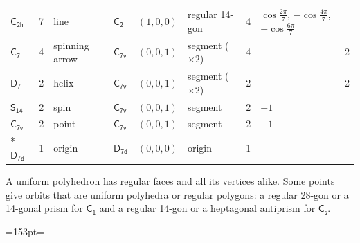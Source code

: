 \documentclass[10pt,a4paper]{article}
\newcommand{\needspace}[1]{\par\penalty-100\begingroup\dimen0=#1\relax\dimen2=\pagegoal
  \advance\dimen2-\pagetotal\ifdim\dimen0>\dimen2\relax\ifdim\dimen2>0pt\vfil\break\fi\fi
  \endgroup}
\numberwithin{equation}{section}
\newcommand{\grp}[1]{\mathsf{#1}}
\newlength{\fillwidth}\newlength{\cellwidth}\newlength{\colwidth}
\begin{document}
{{\begin{longtable}{@{}lrllllr>{\RaggedRight\arraybackslash}p{\fillwidth}r@{}}
\href{C2h.pdf}{$\grp{C_{2h}}$} & 7 & line & \href{C2.pdf}{$\grp{C_{2}}$} & $(1, 0, 0)$ & regular 14-gon & 4 & ${\cos\tfrac{2\pi}{7}}$, ${-\cos\tfrac{4\pi}{7}}$, ${-\cos\tfrac{6\pi}{7}}$ & \\
\href{C7.pdf}{$\grp{C_{7}}$} & 4 & spinning arrow & \href{C7v.pdf}{$\grp{C_{7v}}$} & $(0, 0, 1)$ & segment (${\times}2$) & 4 &  & 2\\
\href{D7.pdf}{$\grp{D_{7}}$} & 2 & helix & \href{C7v.pdf}{$\grp{C_{7v}}$} & $(0, 0, 1)$ & segment (${\times}2$) & 2 &  & 2\\
\href{S14.pdf}{$\grp{S_{14}}$} & 2 & spin & \href{C7v.pdf}{$\grp{C_{7v}}$} & $(0, 0, 1)$ & segment & 2 & ${-1}$ & \\
\href{C7v.pdf}{$\grp{C_{7v}}$} & 2 & point & \href{C7v.pdf}{$\grp{C_{7v}}$} & $(0, 0, 1)$ & segment & 2 & ${-1}$ & \\*
\href{D7d.pdf}{$\grp{D_{7d}}$} & 1 & origin & \href{D7d.pdf}{$\grp{D_{7d}}$} & $(0, 0, 0)$ & origin & 1 &  & \\
\bottomrule\end{longtable}}}
A uniform polyhedron has regular faces and all its vertices alike. Some points give orbits that are uniform polyhedra or regular polygons: a regular 28-gon or a 14-gonal prism for \href{C1.pdf}{$\grp{C_{1}}$} and a regular 14-gon or a heptagonal antiprism for \href{C1v.pdf}{$\grp{C_{s}}$}.
\needspace{153pt}
\end{document}
